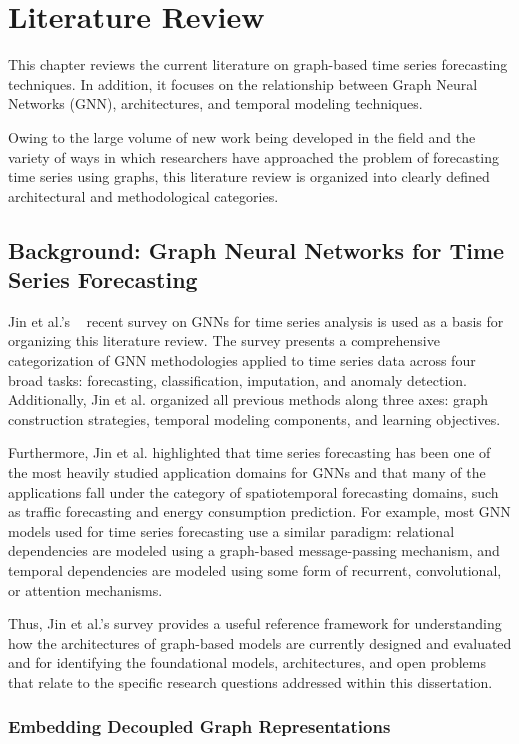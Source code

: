 \chapter{Literature Review} \label{chap:ch2}

This chapter reviews the current literature on graph-based time series forecasting techniques. In addition, it focuses on the relationship between Graph Neural Networks (GNN), architectures, and temporal modeling techniques.

Owing to the large volume of new work being developed in the field and the variety of ways in which researchers have approached the problem of forecasting time series using graphs, this literature review is organized into clearly defined architectural and methodological categories.


\section{Background: Graph Neural Networks for Time Series Forecasting}

Jin et al.'s ~\cite{jin2024survey} recent survey on GNNs for time series analysis is used as a basis for organizing this literature review. The survey presents a comprehensive categorization of GNN methodologies applied to time series data across four broad tasks: forecasting, classification, imputation, and anomaly detection. Additionally, Jin et al. organized all previous methods along three axes: graph construction strategies, temporal modeling components, and learning objectives.

Furthermore, Jin et al. highlighted that time series forecasting has been one of the most heavily studied application domains for GNNs and that many of the applications fall under the category of spatiotemporal forecasting domains, such as traffic forecasting and energy consumption prediction. For example, most GNN models used for time series forecasting use a similar paradigm: relational dependencies are modeled using a graph-based message-passing mechanism, and temporal dependencies are modeled using some form of recurrent, convolutional, or attention mechanisms.

Thus, Jin et al.’s survey provides a useful reference framework for understanding how the architectures of graph-based models are currently designed and evaluated and for identifying the foundational models, architectures, and open problems that relate to the specific research questions addressed within this dissertation.
\subsection{Embedding Decoupled Graph Representations} \label{sec:decoupled_embeddings}

